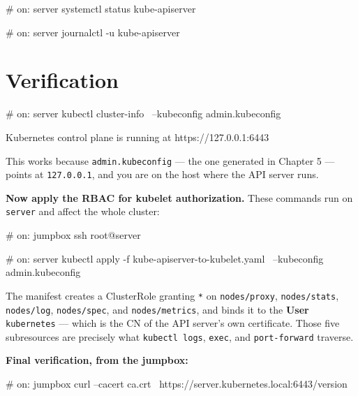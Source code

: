 \documentclass[11pt,oneside]{report}
\begin{document}
\begin{cmdlst}
# on: server
systemctl status kube-apiserver
\end{cmdlst}

\begin{cmdlst}
# on: server
journalctl -u kube-apiserver
\end{cmdlst}

\hypertarget{verification-7}{%
\section{Verification}\label{verification-7}}

\begin{cmdlst}
# on: server
kubectl cluster-info \
  --kubeconfig admin.kubeconfig
\end{cmdlst}

\begin{outlst}
Kubernetes control plane is running at https://127.0.0.1:6443
\end{outlst}

This works because
\texttt{admin.}\allowbreak{}\texttt{kubeconfig}
--- the one
generated in Chapter
5 --- points at
\texttt{127.0.0.1},
and you are on the
host where the API
server runs.

\textbf{Now apply
the RBAC for kubelet
authorization.}
These commands run
on \texttt{server}
and affect the whole
cluster:

\begin{cmdlst}
# on: jumpbox
ssh root@server
\end{cmdlst}

\begin{cmdlst}
# on: server
kubectl apply -f kube-apiserver-to-kubelet.yaml \
  --kubeconfig admin.kubeconfig
\end{cmdlst}

The manifest creates
a ClusterRole
granting \texttt{*}
on
\texttt{nodes/proxy},
\texttt{nodes/stats},
\texttt{nodes/log},
\texttt{nodes/spec},
and
\texttt{nodes/metrics},
and binds it to the
\textbf{User}
\texttt{kubernetes}
--- which is the CN
of the API server's
own certificate.
Those five
subresources are
precisely what
\texttt{kubectl\ logs},
\texttt{exec}, and
\texttt{port-forward}
traverse.

\textbf{Final
verification, from
the jumpbox:}

\begin{cmdlst}
# on: jumpbox
curl --cacert ca.crt \
  https://server.kubernetes.local:6443/version
\end{cmdlst}
\end{document}
